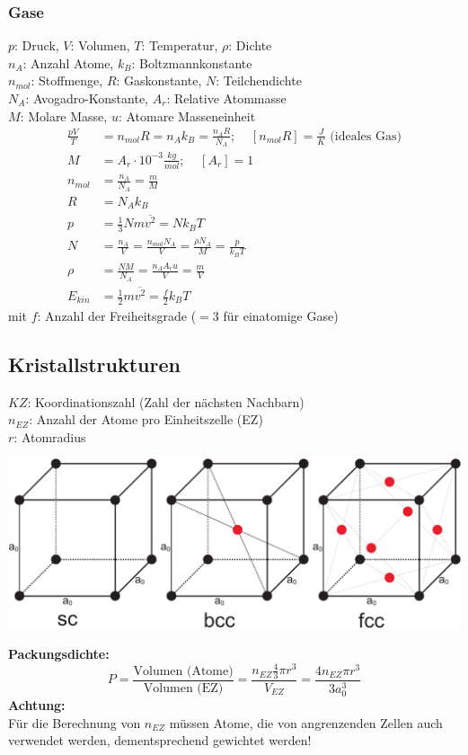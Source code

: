 \documentclass[a4paper,twocolumn,10pt]{article}
\begin{document}
\subsubsection{Gase}
$p$: Druck, $V$: Volumen, $T$: Temperatur, $\rho$: Dichte\\
$n_A$: Anzahl Atome, $k_B$: Boltzmannkonstante\\
$n_{mol}$: Stoffmenge, $R$: Gaskonstante, $N$: Teilchendichte\\
$N_A$: Avogadro-Konstante, $A_r$: Relative Atommasse\\
$M$: Molare Masse, $u$: Atomare Masseneinheit\\
\begin{equation*}
\begin{split}
\frac{pV}{T}&=n_{mol}R=n_Ak_B=\frac{n_AR}{N_A};\;\;\;\;[n_{mol}R]=\frac{J}{K}\text{ (ideales Gas)}\\
M&=A_r\cdot 10^{-3}\frac{kg}{mol};\;\;\;\;[A_r]=1\\
n_{mol}&=\frac{n_A}{N_A}=\frac{m}{M}\\
R&=N_Ak_B\\
p&=\frac{1}{3}Nm\overline{v^2}=Nk_BT\\
N&=\frac{n_A}{V}=\frac{n_{mol}N_A}{V}=\frac{\rho N_A}{M}=\frac{p}{k_BT}\\
\rho &=\frac{NM}{N_A}=\frac{n_AA_ru}{V}=\frac{m}{V}\\
E_{kin}&=\frac{1}{2}m\overline{v^2}=\frac{f}{2}k_BT
\end{split}
\end{equation*}
mit $f$: Anzahl der Freiheitsgrade ($=3$ für einatomige Gase)

\subsection{Kristallstrukturen}
$KZ$: Koordinationszahl (Zahl der nächsten Nachbarn)\\
$n_{EZ}$: Anzahl der Atome pro Einheitszelle (EZ)\\
$r$: Atomradius\\
\begin{center}
\includegraphics[width=0.9\columnwidth]{Grafiken/Kristallstrukturen}
\end{center}
\textbf{Packungsdichte:}
\begin{equation*}
P=\frac{\text{Volumen (Atome)}}{\text{Volumen (EZ)}}=\frac{n_{EZ}\frac{4}{3}\pi r^3}{V_{EZ}}=\frac{4n_{EZ}\pi r^3}{3a_0^3}
\end{equation*}
\textbf{Achtung:}\\
Für die Berechnung von $n_{EZ}$ müssen Atome, die von angrenzenden Zellen auch verwendet werden, dementsprechend gewichtet werden!
\end{document}

